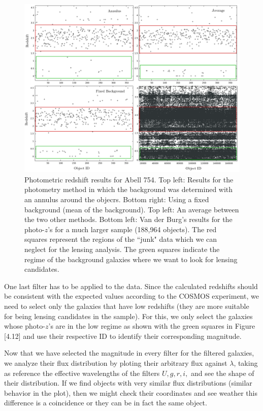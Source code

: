 \begin{figure}[H]
\centering
\includegraphics[width=15cm]{images/photo_z_red_squares.png}
\caption[Photometric redshift results for Abell 754]{Photometric redshift results for Abell 754. Top left: Results for the photometry method in which the background was determined with an annulus around the objecrs. Bottom right: Using a fixed background (mean of the background). Top left: An average between the two other methods. Bottom left: Van der Burg's results for the photo-$z$'s for a much larger sample (188,964 objects). The red squares represent the regions of the ``junk" data which we can neglect for the lensing analysis. The green squares indicate the regime of the background galaxies where we want to look for lensing candidates.}
\end{figure}

One last filter has to be applied to the data. Since the calculated redshifts should be consistent with the expected values according to the COSMOS experiment, we need to select only the galaxies that have low redshifts (they are more suitable for being lensing candidates in the sample). For this, we only select the galaxies whose photo-$z$'s are in the low regime as shown with the green squares in Figure [4.12] and use their respective ID to identify their corresponding magnitude. 

Now that we have selected the magnitude in every filter for the filtered galaxies, we analyze their flux distribution by ploting their arbitrary flux against $\lambda$, taking as reference the effective wavelengths of the filters $U,g,r,i,$ and see the shape of their distribution. If we find objects with very similar flux distributions (similar behavior in the plot), then we might check their coordinates and see weather this difference is a coincidence or they can be in fact the same object.

